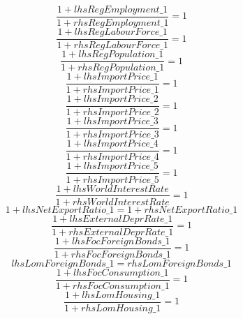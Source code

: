 \begin{dmath}
\frac{1+{lhsRegEmployment\_1}}{1+{rhsRegEmployment\_1}}=1
\end{dmath}
\begin{dmath}
\frac{1+{lhsRegLabourForce\_1}}{1+{rhsRegLabourForce\_1}}=1
\end{dmath}
\begin{dmath}
\frac{1+{lhsRegPopulation\_1}}{1+{rhsRegPopulation\_1}}=1
\end{dmath}
\begin{dmath}
\frac{1+{lhsImportPrice\_1}}{1+{rhsImportPrice\_1}}=1
\end{dmath}
\begin{dmath}
\frac{1+{lhsImportPrice\_2}}{1+{rhsImportPrice\_2}}=1
\end{dmath}
\begin{dmath}
\frac{1+{lhsImportPrice\_3}}{1+{rhsImportPrice\_3}}=1
\end{dmath}
\begin{dmath}
\frac{1+{lhsImportPrice\_4}}{1+{rhsImportPrice\_4}}=1
\end{dmath}
\begin{dmath}
\frac{1+{lhsImportPrice\_5}}{1+{rhsImportPrice\_5}}=1
\end{dmath}
\begin{dmath}
\frac{1+{lhsWorldInterestRate}}{1+{rhsWorldInterestRate}}=1
\end{dmath}
\begin{dmath}
1+{lhsNetExportRatio\_1}=1+{rhsNetExportRatio\_1}
\end{dmath}
\begin{dmath}
\frac{1+{lhsExternalDeprRate\_1}}{1+{rhsExternalDeprRate\_1}}=1
\end{dmath}
\begin{dmath}
\frac{1+{lhsFocForeignBonds\_1}}{1+{rhsFocForeignBonds\_1}}=1
\end{dmath}
\begin{dmath}
{lhsLomForeignBonds\_1}={rhsLomForeignBonds\_1}
\end{dmath}
\begin{dmath}
\frac{1+{lhsFocConsumption\_1}}{1+{rhsFocConsumption\_1}}=1
\end{dmath}
\begin{dmath}
\frac{1+{lhsLomHousing\_1}}{1+{rhsLomHousing\_1}}=1
\end{dmath}
